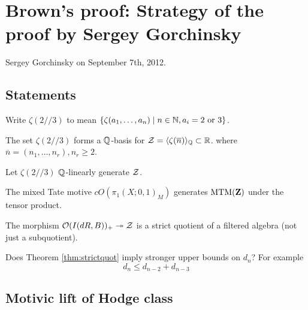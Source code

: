 \chapter{Brown's proof: Strategy of the proof by Sergey Gorchinsky}

Sergey Gorchinsky on September 7th, 2012.

\medskip
\medskip

\section{Statements}

Write $\zeta(2//3)$ to mean $\{\zeta(a_1, \ldots, a_n) \mid n \in \mathbb{N}, a_i = \textrm{2 or 3} \}$.
\begin{conj}[Hoffman]
The set $\zeta(2//3)$ forms a $\mathbb{Q}$-basis for $\mathcal{Z} = \langle \zeta(\overline{n}) \rangle_{\mathbb{Q}} \subset \mathbb{R}$. where $\overline{n} = (n_1, \ldots, n_r), n_r \geq 2$.
\end{conj}
\begin{conj}
Let $\zeta(2//3)$ $\mathbb{Q}$-linearly generate $\mathcal{Z}$.
\end{conj}
\begin{thm}\label{thm:mtmgenerates}
The mixed Tate motive $cO(\pi_1(X;0,1)_M)$ generates $\mathrm{MTM}(\mathbf{Z})$ under the tensor product.
\end{thm}
\begin{thm}\label{thm:strictquot}
The morphism $\mathcal{O}(I(dR,B))_{+} \twoheadrightarrow \mathcal{Z}$ is a strict quotient of a filtered algebra (not just a subquotient).
\end{thm}

\begin{ques}
Does Theorem \ref{thm:strictquot} imply stronger upper bounds on $d_n$? For example
\[
d_n \leq d_{n-2} + d_{n-3}
\]
\end{ques}

\section{Motivic lift of Hodge class}
